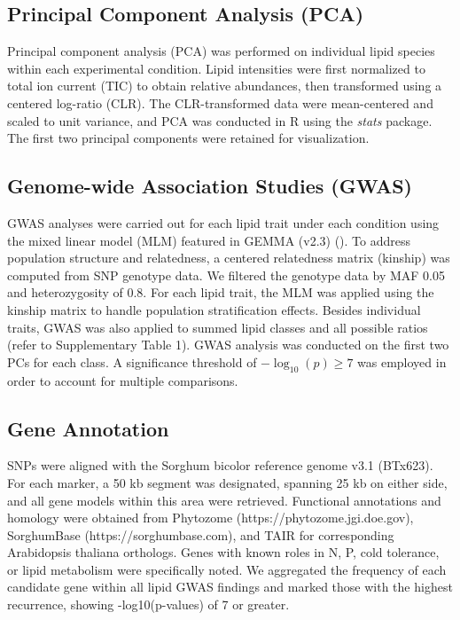 \documentclass[9pt,twocolumn,twoside]{rilabRxiv}
\begin{document}
\subsection*{Principal Component Analysis (PCA)}

Principal component analysis (PCA) was performed on individual lipid species within each experimental condition. Lipid intensities were first normalized to total ion current (TIC) to obtain relative abundances, then transformed using a centered log-ratio (CLR). The CLR-transformed data were mean-centered and scaled to unit variance, and PCA was conducted in R using the \emph{stats} package. The first two principal components were retained for visualization.


\subsection*{Genome-wide Association Studies (GWAS)} 

GWAS analyses were carried out for each lipid trait under each condition using the mixed linear model (MLM) featured in GEMMA (v2.3) (\cite{Zhou2012}). To address population structure and relatedness, a centered relatedness matrix (kinship) was computed from SNP genotype data. We filtered the genotype data by MAF 0.05 and heterozygosity of 0.8. For each lipid trait, the MLM was applied using the kinship matrix to handle population stratification effects. Besides individual traits, GWAS was also applied to summed lipid classes and all possible ratios (refer to Supplementary Table 1). GWAS analysis was conducted on the first two PCs for each class. A significance threshold of \(-\log_{10}(p) \geq 7\) was employed in order to account for multiple comparisons. 

\subsection*{Gene Annotation}

SNPs were aligned with the Sorghum bicolor reference genome v3.1 (BTx623). For each marker, a 50 kb segment was designated, spanning 25 kb on either side, and all gene models within this area were retrieved. Functional annotations and homology were obtained from Phytozome (https://phytozome.jgi.doe.gov), SorghumBase (https://sorghumbase.com), and TAIR for corresponding Arabidopsis thaliana orthologs. Genes with known roles in N, P, cold tolerance, or lipid metabolism were specifically noted. We aggregated the frequency of each candidate gene within all lipid GWAS findings and marked those with the highest recurrence, showing -log10(p-values) of 7 or greater.
\end{document}
